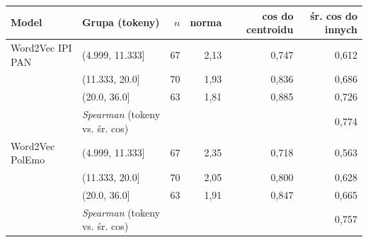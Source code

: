 \begin{tabular}{llrrrr}
\toprule
Model & Grupa (tokeny) & $n$ & norma & cos do centroidu & śr. cos do innych \\
\midrule
Word2Vec IPI PAN & (4.999, 11.333] & 67 & 2{,}13 & 0{,}747 & 0{,}612 \\
 & (11.333, 20.0] & 70 & 1{,}93 & 0{,}836 & 0{,}686 \\
 & (20.0, 36.0] & 63 & 1{,}81 & 0{,}885 & 0{,}726 \\
 & \emph{Spearman} (tokeny vs. śr. cos) &  &  &  & 0{,}774 \\
\midrule
Word2Vec PolEmo & (4.999, 11.333] & 67 & 2{,}35 & 0{,}718 & 0{,}563 \\
 & (11.333, 20.0] & 70 & 2{,}05 & 0{,}800 & 0{,}628 \\
 & (20.0, 36.0] & 63 & 1{,}91 & 0{,}847 & 0{,}665 \\
 & \emph{Spearman} (tokeny vs. śr. cos) &  &  &  & 0{,}757 \\
\bottomrule
\end{tabular}
